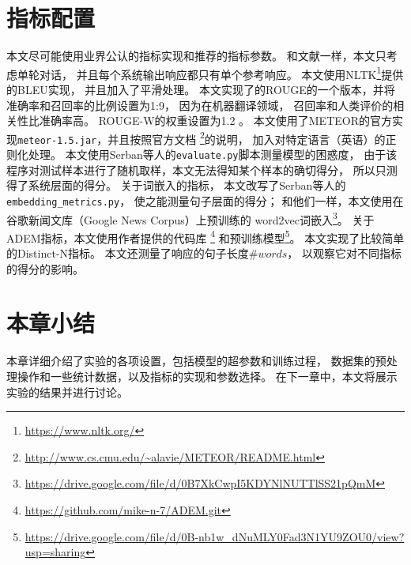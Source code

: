 \section{指标配置}\label{sec:metric_config}
本文尽可能使用业界公认的指标实现和推荐的指标参数。
和文献\cite{HowNot}一样，本文只考虑单轮对话，
并且每个系统输出响应都只有单个参考响应。
本文使用NLTK\footnote{\url{https://www.nltk.org/}}提供的BLEU实现，
并且加入了平滑处理。
本文实现了的ROUGE的一个版本，并将准确率和召回率的比例设置为1:9，
因为在机器翻译领域，
召回率和人类评价的相关性比准确率高。
ROUGE-W的权重设置为1.2 。
本文使用了METEOR的官方实现\texttt{meteor-1.5.jar}，并且按照官方文档
\footnote{\url{http://www.cs.cmu.edu/~alavie/METEOR/README.html}}的说明，
加入对特定语言（英语）的正则化处理。
本文使用Serban等人的\texttt{evaluate.py}脚本测量模型的困惑度，
由于该程序对测试样本进行了随机取样，本文无法得知某个样本的确切得分，
所以只测得了系统层面的得分。
关于词嵌入的指标，
本文改写了Serban等人的\texttt{embedding\_metrics.py}，
使之能测量句子层面的得分；
和他们一样，本文使用在谷歌新闻文库（Google News Corpus）上预训练的
word2vec词嵌入\footnote{\url{https://drive.google.com/file/d/0B7XkCwpI5KDYNlNUTTlSS21pQmM}}。
关于ADEM指标，本文使用作者提供的代码库
\footnote{\url{https://github.com/mike-n-7/ADEM.git}}
和预训练模型\footnote{\url{https://drive.google.com/file/d/0B-nb1w_dNuMLY0Fad3N1YU9ZOU0/view?usp=sharing}}。
本文实现了比较简单的Distinct-N指标。
本文还测量了响应的句子长度$\textit{\#words}$，
以观察它对不同指标的得分的影响。

\section{本章小结}\label{sec:method_conclusion}
本章详细介绍了实验的各项设置，包括模型的超参数和训练过程，
数据集的预处理操作和一些统计数据，以及指标的实现和参数选择。
在下一章中，本文将展示实验的结果并进行讨论。
